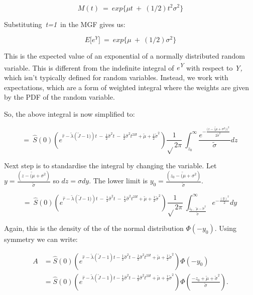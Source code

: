 \documentclass[12pt,a4paper]{report}
\numberwithin{equation}{section}
\begin{document}
\[M(t)\  = \ exp\{\mu t\  + \ (1/2)t^{2}\sigma^{2}\}\]

Substituting~\emph{t=1}~in the MGF gives us:

\[E\lbrack e^{Y}\rbrack\  = \ exp\{\mu\  + \ (1/2)\sigma^{2}\}\]

This is the expected value of an exponential of a normally distributed
random variable. This is different from the indefinite integral of
\emph{e\textsuperscript{Y}} with respect to \emph{Y,} which isn't
typically defined for random variables. Instead, we work with
expectations, which are a form of weighted integral where the weights
are given by the PDF of the random variable.

So, the above integral is now simplified to:

\[= \ \widehat{S}(0)\left( e^{\widehat{r} - \widetilde{\lambda}\left( \widetilde{J} - 1) \right)t\  - \ \frac{1}{2}{\widehat{\sigma}}^{2}t\  - \ \frac{1}{2}{\widehat{\sigma}}^{2}t^{2H} + \widetilde{\mu} + \frac{1}{2}{\widetilde{\sigma}}^{2}} \right)\frac{1}{\sqrt{}2\pi}\ \int_{z_{0}}^{\infty}{\frac{e^{- \frac{(z - \widetilde{(\mu} + \sigma^{2}{))}^{2}}{2{\widetilde{\sigma}}^{2}}}}{\widetilde{\sigma}}dz\ }\]

Next step is to standardise the integral by changing the variable. Let
\(y = \frac{(z - \widetilde{(\mu} + \sigma^{2})}{\widetilde{\sigma}}\)
so \(dz = \sigma dy.\) The lower limit is
\(y_{0} = \frac{(z_{0} - \widetilde{(\mu} + \sigma^{2})}{\widetilde{\sigma}}.\)

\[= \ \widehat{S}(0)\left( e^{\widehat{r} - \widetilde{\lambda}\left( \widetilde{J} - 1) \right)t\  - \ \frac{1}{2}{\widehat{\sigma}}^{2}t\  - \ \frac{1}{2}{\widehat{\sigma}}^{2}t^{2H} + \widetilde{\mu} + \frac{1}{2}{\widetilde{\sigma}}^{2}} \right)\frac{1}{\sqrt{}2\pi}\ \int_{\frac{z_{0 -}\widetilde{\ \mu} - {\widetilde{\sigma}}^{2}}{\widetilde{\sigma}}}^{\infty}{e^{- \frac{(y)^{2}}{2}}dy\ }\]

Again, this is the density of the of the normal distribution
\(\Phi( - y_{0})\). Using symmetry we can write:

\[
\begin{aligned}
A
&= \widehat{S}(0)\left(
e^{\widehat{r}-\widetilde{\lambda}\left(\widetilde{J}-1\right)t
-\frac{1}{2}\widehat{\sigma}^{2}t
-\frac{1}{2}\widehat{\sigma}^{2}t^{2H}
+\widetilde{\mu}+\frac{1}{2}\widetilde{\sigma}^{2}}
\right)\Phi(-y_{0}) \\
&= \widehat{S}(0)\left(
e^{\widehat{r}-\widetilde{\lambda}\left(\widetilde{J}-1\right)t
-\frac{1}{2}\widehat{\sigma}^{2}t
-\frac{1}{2}\widehat{\sigma}^{2}t^{2H}
+\widetilde{\mu}+\frac{1}{2}\widetilde{\sigma}^{2}}
\right)\Phi\!\left(\frac{-z_{0}+\widetilde{\mu}+\widetilde{\sigma}^{2}}{\widetilde{\sigma}}\right).
\end{aligned}
\]
\end{document}
